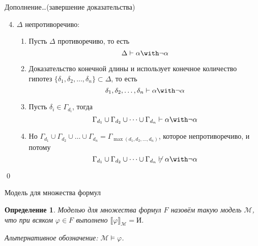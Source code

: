 \documentclass[aspectratio=169]{beamer}
\newtheorem{dfn}{Определение}[section]
\begin{document}
\begin{frame}{Дополнение\dots (завершение доказательства)}\vspace{-1cm}
\begin{block}{}
\begin{enumerate}\setcounter{enumi}{3}
  \item $\Delta$ непротиворечиво:
  \begin{enumerate}
    \item Пусть $\Delta$ противоречиво, то есть $$\Delta \vdash \alpha\with\neg\alpha$$\pause\vspace{-0.2cm}
    \item Доказательство конечной длины и использует конечное количество гипотез $\{\delta_1, \delta_2, \dots, \delta_n\} \subset \Delta$,
          то есть $$\delta_1, \delta_2, \dots, \delta_n \vdash \alpha\with\neg\alpha$$\pause\vspace{-0.2cm}
    \item Пусть $\delta_i \in \Gamma_{d_i}$, тогда $$\Gamma_{d_1}\cup \Gamma_{d_2}\cup \dots\cup \Gamma_{d_n} \vdash \alpha\with\neg\alpha$$\pause\vspace{-0.2cm}
    \item Но $\Gamma_{d_1} \cup \Gamma_{d_2} \cup \dots \cup \Gamma_{d_n} = \Gamma_{\max(d_1,d_2,\dots,d_n)}$,
          которое непротиворечиво, и потому $$\Gamma_{d_1}\cup \Gamma_{d_2}\cup \dots\cup \Gamma_{d_n} \not\vdash \alpha\with\neg\alpha$$
  \end{enumerate}\pause\vspace{-0.5cm}
\end{enumerate}
\qed
\end{block}
\end{frame}

\begin{frame}{Модель для множества формул}
\begin{dfn}Моделью для множества формул $F$ назовём такую модель $\mathcal{M}$, что
    при всяком $\varphi \in F$ выполнено $\llbracket\varphi\rrbracket_\mathcal{M} = \text{И}$.\pause

Альтернативное обозначение: $\mathcal{M}\models\varphi$.
\end{dfn}
\end{frame}
\end{document}
